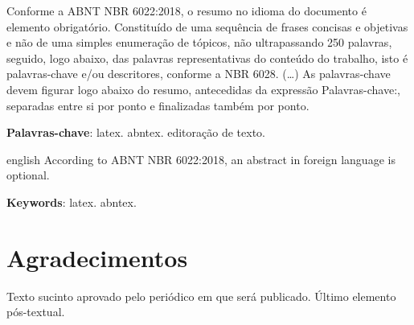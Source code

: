 \documentclass[
	article,			%
	11pt,				%
	oneside,			%
	a4paper,			%
	english,			%
	brazil,				%
	sumario=tradicional
	]{abntex2}
\begin{document}
\frenchspacing
%
\maketitle

\begin{resumoumacoluna}
   Conforme a ABNT NBR 6022:2018, o resumo no idioma do documento é elemento obrigatório.
   Constituído de uma sequência de frases concisas e objetivas e não de uma simples enumeração de tópicos, não ultrapassando 250 palavras, seguido, logo abaixo, das palavras representativas do conteúdo do trabalho, isto é palavras-chave e/ou descritores, conforme a NBR 6028. (\ldots)
   As palavras-chave devem figurar logo abaixo do resumo, antecedidas da expressão Palavras-chave:, separadas entre si por ponto e finalizadas também por ponto.

   \vspace{\onelineskip}

   \noindent
   \textbf{Palavras-chave}: latex. abntex. editoração de texto.
\end{resumoumacoluna}

\renewcommand{\resumoname}{Abstract}
\begin{resumoumacoluna}
   \begin{otherlanguage*}{english}
      According to ABNT NBR 6022:2018, an abstract in foreign language is optional.

      \vspace{\onelineskip}

      \noindent
      \textbf{Keywords}: latex. abntex.
   \end{otherlanguage*}
\end{resumoumacoluna}

\textual
%





\postextual
% 

% 
\section*{Agradecimentos}
Texto sucinto aprovado pelo periódico em que será publicado. Último elemento pós-textual.
%
\end{document}
